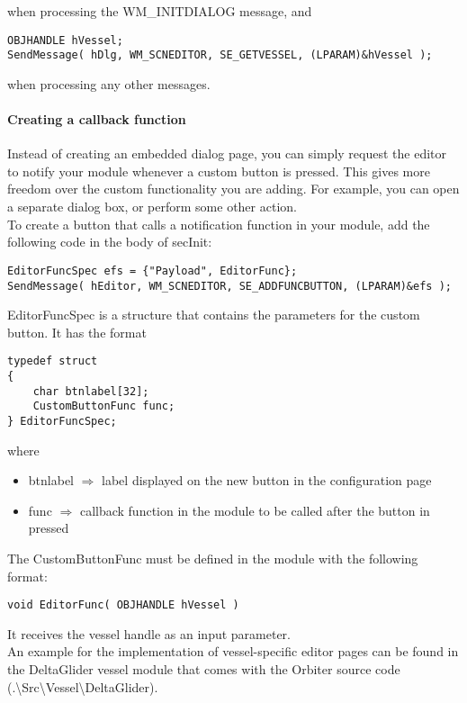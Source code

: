 \documentclass[Orbiter Developer Manual.tex]{subfiles}
\begin{document}
\noindent
when processing the WM\_INITDIALOG message, and

\begin{lstlisting}
OBJHANDLE hVessel;
SendMessage( hDlg, WM_SCNEDITOR, SE_GETVESSEL, (LPARAM)&hVessel );
\end{lstlisting}

\noindent
when processing any other messages.

\paragraph{Creating a callback function}
Instead of creating an embedded dialog page, you can simply request the editor to notify your module whenever a custom button is pressed. This gives more freedom over the custom functionality you are adding. For example, you can open a separate dialog box, or perform some other action.\\
To create a button that calls a notification function in your module, add the following code in the body of secInit:

\begin{lstlisting}
EditorFuncSpec efs = {"Payload", EditorFunc};
SendMessage( hEditor, WM_SCNEDITOR, SE_ADDFUNCBUTTON, (LPARAM)&efs );
\end{lstlisting}

\noindent
EditorFuncSpec is a structure that contains the parameters for the custom button. It has the format

\begin{lstlisting}
typedef struct
{
	char btnlabel[32];
	CustomButtonFunc func;
} EditorFuncSpec;
\end{lstlisting}

\noindent
where

\begin{itemize}
\item btnlabel $\Rightarrow$ label displayed on the new button in the configuration page
\item func $\Rightarrow$ callback function in the module to be called after the button in pressed
\end{itemize}

\noindent
The CustomButtonFunc must be defined in the module with the following format:

\begin{lstlisting}
void EditorFunc( OBJHANDLE hVessel )
\end{lstlisting}

\noindent
It receives the vessel handle as an input parameter.\\
An example for the implementation of vessel-specific editor pages can be found in the DeltaGlider vessel module that comes with the Orbiter source code (.\textbackslash Src\textbackslash Vessel\textbackslash DeltaGlider).
\end{document}
